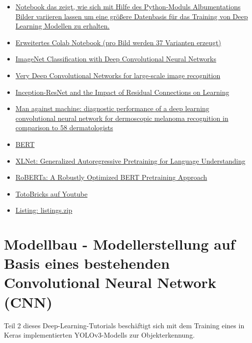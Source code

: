 \begin{itemize}
\item \href{https://colab.research.google.com/drive/17rnQksOkR1YTbSPwH33NUwqsh5CQv5Ry}{Notebook das zeigt, wie sich mit Hilfe des Python-Moduls Albumentations Bilder variieren lassen um eine größere Datenbasis für das Training von Deep Learning Modellen zu erhalten.}
\item \href{https://colab.research.google.com/drive/1Dee633DserPwu289_EpwD10T794aFaUY}{Erweitertes Colab Notebook (pro Bild werden 37 Varianten erzeugt)}
\item \href{https://papers.nips.cc/paper/4824-imagenet-classification-with-deep-convolutional-neural-networks.pdf}{ImageNet Classification with Deep Convolutional Neural Networks }
\item \href{https://arxiv.org/pdf/1409.1556.pdf}{Very Deep Convolutional Networks for large-scale image recognition }
\item \href{https://arxiv.org/abs/1602.07261}{Inception-ResNet and the Impact of Residual Connections on Learning }
\item \href{https://www.journals.elsevier.com/annals-of-oncology}{Man against machine: diagnostic performance of a deep learning convolutional neural network for dermoscopic melanoma recognition in comparison to 58 dermatologists }
\item \href{https://github.com/google-research/bert}{BERT }
\item \href{https://arxiv.org/pdf/1906.08237.pdf}{XLNet: Generalized Autoregressive Pretraining for Language Understanding }
\item \href{https://arxiv.org/abs/1907.11692}{RoBERTa: A Robustly Optimized BERT Pretraining Approach }
\item \href{https://www.youtube.com/channel/UCWDdBL2CqSa-h0F5JifAcxg}{TotoBricks auf Youtube }
\item \href{Python/ModellbauListings.zip}{Listing: listings.zip} 
\end{itemize}



\chapter{Modellbau -  Modellerstellung auf Basis eines bestehenden Convolutional Neural Network (CNN)}

Teil 2 dieses Deep-Learning-Tutorials beschäftigt sich mit dem Training eines in Keras implementierten YOLOv3-Modells zur Objekterkennung.

